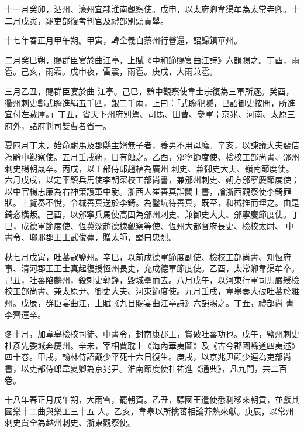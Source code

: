 \begin{pinyinscope}
 十一月癸卯，泗州、濠州宜隸淮南觀察使。戊申，以太府卿韋渠牟為太常寺卿。十二月戊寅，罷吏部復考判官及禮部別頭貢舉。



 十七年春正月甲午朔。甲寅，韓全義自蔡州行營還，詔歸鎮華州。



 二月癸巳朔，賜群臣宴於曲江亭，上賦《中和節賜宴曲江詩》六韻賜之。丁酉，雨雹。己亥，雨霜。戊申夜，雷震，雨雹。庚戌，大雨兼雹。



 三月乙丑，賜群臣宴於曲
 江亭。己巳，黔中觀察使韋士宗復為三軍所逐。癸酉，衢州刺史鄭式瞻進絹五千匹，銀二千兩，上曰：「式瞻犯贓，已詔御史按問，所進宜付左藏庫。」丁丑，省天下州府別駕、司馬、田曹、參軍；京兆、河南、太原三府外，諸府判司雙曹者省一。



 夏四月丁未，始命駙馬及郡縣主婿無子者，養男不用母廕。辛亥，以諫議大夫裴佶為黔中觀察使。五月壬戌朔，日有蝕之。乙酉，邠寧節度使、檢校工部尚書、邠州刺史楊朝晟卒。丙戌，以工部侍郎趙植為廣州
 刺史、兼御史大夫、嶺南節度使。六月戊戌，以定平鎮兵馬使李朝寀校工部尚書，兼邠州刺史、朔方邠寧慶節度使；以中官楊志廉為右神策護軍中尉。浙西人崔善真詣闕上書，論浙西觀察使李錡罪狀。上覽奏不悅，令械善真送於李錡。為鑿坑待善真，既至，和械推而埋之。由是錡恣橫叛。己酉，以邠寧兵馬使高固為邠州刺史、兼御史大夫、邠寧慶節度使。丁巳，成德軍節度使、恆冀深趙德棣觀察等使、恆州大都督府長史、檢校太尉、
 中書令、瑯邪郡王王武俊薨，贈太師，謚曰忠烈。



 秋七月戊寅，吐蕃寇鹽州。辛巳，以前成德軍節度副使、檢校工部尚書、知恆府事、清河郡王王士真起復授恆州長史，充成德軍節度使。乙酉，太常卿韋渠牟卒。己丑，吐蕃陷麟州，殺刺史郭鋒，毀城壘而去。八月戊午，以河東行軍司馬嚴綬檢校工部尚書、兼太原尹、御史大夫、河東節度使。九月壬戌，韋皋奏大破吐蕃於雅州。戊辰，群臣宴曲江，上賦《九日賜宴曲江亭詩》六韻賜之。丁丑，禮部尚
 書李齊運卒。



 冬十月，加韋皋檢校司徒、中書令，封南康郡王，賞破吐蕃功也。戊午，鹽州刺史杜彥先委城奔慶州。辛未，宰相賈耽上《海內華夷圖》及《古今郡國縣道四夷述》四十卷。甲戌，翰林侍詔戴少平死十六日復生。庚戌，以京兆尹顧少連為吏部尚書，以吏部侍郎韋夏卿為京兆尹。淮南節度使杜祐進《通典》，凡九門，共二百卷。



 十八年春正月戊午朔，大雨雪，罷朝賀。乙丑，驃國王遣使悉利移來朝貢，並獻其國樂十二曲與樂工三十五
 人。乙亥，韋皋以所擒蕃相論莽熱來獻。庚辰，以常州刺史賈全為越州刺史、浙東觀察使。




\end{pinyinscope}
